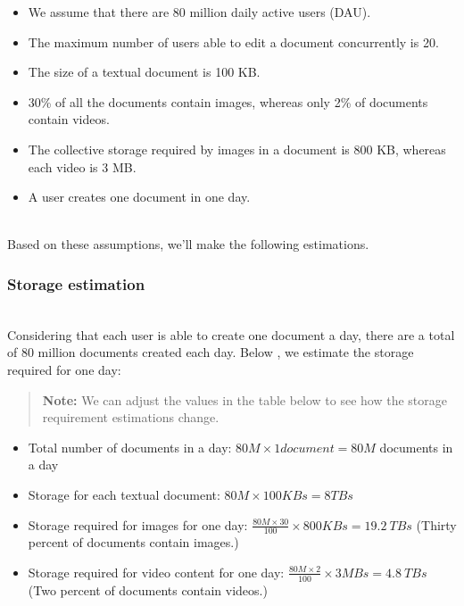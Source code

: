 \begin{itemize}
\item
\protect{}\label{oneEqRn-2UdjuzTy1kL4G}
We assume that there are 80 million daily active users (DAU).
\item
\protect{}\label{xy6IS27y6wY48kZnDyH1m}
The maximum number of users able to edit a document concurrently is 20.
\item
\protect{}\label{WAI6ATX6Mk7nc_RVaf3sj}
The size of a textual document is 100 KB.
\item
\protect{}\label{vbOPtHuJMpDxbrOJ4a_sj}
30\% of all the documents contain images, whereas only 2\% of documents contain videos.
\item
\protect{}\label{vZSatrwhFtJffeaQkwBYr}
The collective storage required by images in a document is 800 KB, whereas each video is 3 MB.
\item
\protect{}\label{w0htPh2QmhXDFSEI42PVF}
A user creates one document in one day.
\end{itemize}
\\
Based on these assumptions, we'll make the following estimations.

\subsubsection{Storage estimation}\label{s-RrBRrFdhBXWFz-2modg}
\\
Considering that each user is able to create one document a day, there are a total of 80 million documents created each day. Below , we estimate the storage required for one day:
\begin{quote}
\textbf{Note:} We can adjust the values in the table below to see how the storage requirement estimations change.
\end{quote}

\begin{itemize}
\tightlist
\item
Total number of documents in a day: \(80M \times 1 document = 80M\) documents in a day
\item
Storage for each textual document: \(80M \times 100KBs = 8 TBs\)
\item
Storage required for images for one day: \(\frac{80M \times 30}{100} \times 800KBs = 19.2 \ TBs\) (Thirty percent of documents contain images.)
\item
Storage required for video content for one day: \(\frac{80M \times 2}{100} \times 3 MBs = 4.8 \ TBs\) (Two percent of documents contain videos.)
\end{itemize}

